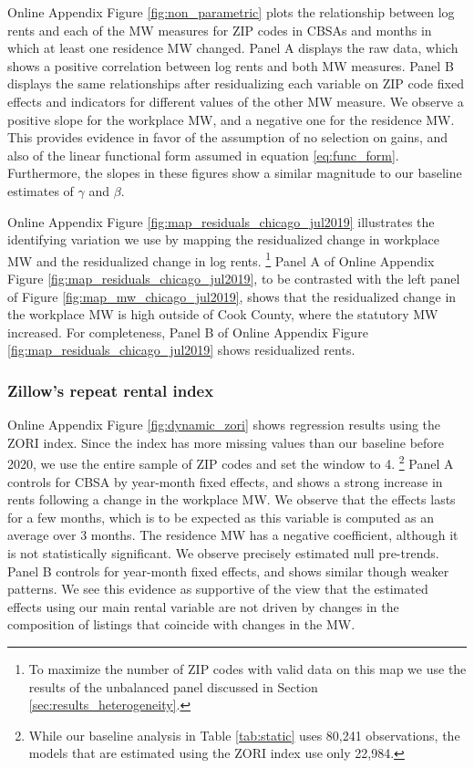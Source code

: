 Online Appendix Figure \ref{fig:non_parametric} plots the relationship between 
log rents and each of the MW measures for ZIP codes in CBSAs and months 
in which at least one residence MW changed.
Panel A displays the raw data, which shows a positive correlation between log 
rents and both MW measures.
Panel B displays the same relationships after residualizing each variable on 
ZIP code fixed effects and indicators for different values of the other MW 
measure.
We observe a positive slope for the workplace MW, and a negative one for
the residence MW.
This provides evidence in favor of the assumption of no selection on gains, and
also of the linear functional form assumed in equation \eqref{eq:func_form}. 
Furthermore, the slopes in these figures show a similar magnitude to our 
baseline estimates of $\gamma$ and $\beta$.

Online Appendix Figure \ref{fig:map_residuals_chicago_jul2019} illustrates the 
identifying variation we use by mapping the residualized change in workplace MW 
and the residualized change in log rents.%
\footnote{To maximize the number of ZIP codes with valid data on this map we
    use the results of the unbalanced panel discussed in Section 
    \ref{sec:results_heterogeneity}.}
Panel A of Online Appendix Figure \ref{fig:map_residuals_chicago_jul2019}, to be 
contrasted with the left panel of Figure \ref{fig:map_mw_chicago_jul2019}, 
shows that the residualized change in the workplace MW is high outside of Cook 
County, where the statutory MW increased.
For completeness, Panel B of Online Appendix Figure 
\ref{fig:map_residuals_chicago_jul2019} shows residualized rents.

\subsubsection{Zillow's repeat rental index}

Online Appendix Figure \ref{fig:dynamic_zori} shows regression results
using the ZORI index.
Since the index has more missing values than our baseline before 2020,
we use the entire sample of ZIP codes and set the window to 4.%
\footnote{While our baseline analysis in Table \ref{tab:static} uses 80,241 
    observations, the models that are estimated using the ZORI index use 
    only 22,984.}
Panel A controls for CBSA by year-month fixed effects, and shows 
a strong increase in rents following a change in the workplace MW.
We observe that the effects lasts for a few months, which is to be expected
as this variable is computed as an average over 3 months.
The residence MW has a negative coefficient, although it is not statistically 
significant.
We observe precisely estimated null pre-trends.
Panel B controls for year-month fixed effects, and shows similar though 
weaker patterns.
We see this evidence as supportive of the view that the estimated effects
using our main rental variable are not driven by changes in the composition
of listings that coincide with changes in the MW.

